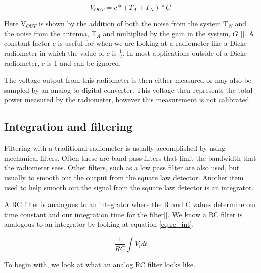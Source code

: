 \begin{equation} \label{eq:vout_1}
V_{OUT}=c*(T_A+T_N)*G
\end{equation}

Here V$_{OUT}$ is shown by the addition of both the noise from the system T$_N$ and the noise from the antenna, T$_A$ and multiplied by the gain in the system, $G$ [\cite{skou}].  A constant factor $c$ is useful for when we are looking at a radiometer like a Dicke radiometer in which the value of $c$ is $\frac{1}{2}$.  In most applications outside of a Dicke radiometer, $c$ is 1 and can be ignored.  

The voltage output from this radiometer is then either measured or may also be sampled by an analog to digital converter.  This voltage then represents the total power measured by the radiometer, however this measurement is not calibrated.


\subsection{Integration and filtering}

Filtering with a traditional radiometer is usually accomplished by using mechanical filters.  Often these are band-pass filters that limit the bandwidth that the radiometer sees.  Other filters, such as a low pass filter are also used, but usually to smooth out the output from the square law detector.  Another item used to help smooth out the signal from the square law detector is an integrator.

A RC filter is analogous to an integrator where the R and C values determine our time constant and our integration time for the filter[\cite{Aitken}].  We know a RC filter is analogous to an integrator by looking at equation \ref{eq:rc_int}.

\begin{equation}\label{eq:rc_int}
\frac{1}{RC}\int{V_idt}
\end{equation}

To begin with, we look at what an analog RC filter looks like. 

